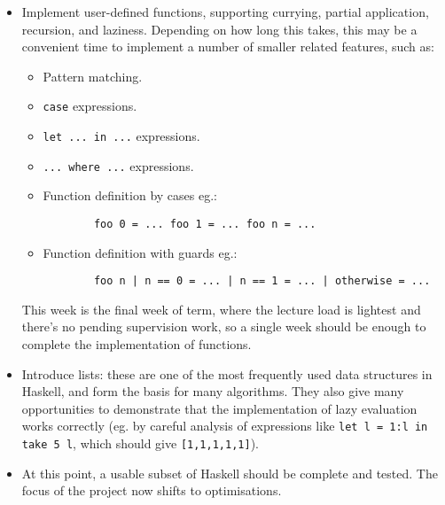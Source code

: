 \documentclass[12pt]{article}
\newcommand\haskell[1]{\texttt{#1}}
\begin{document}
\begin{itemize}
{}
\item
{

    Implement user-defined functions, supporting currying, partial application, recursion, and laziness. Depending on
    how long this takes, this may be a convenient time to implement a number of smaller related features, such as:
    
    \begin{itemize}
    \item Pattern matching.
    \item \haskell{case} expressions.
    \item \haskell{let ... in ...} expressions.
    \item \haskell{... where ...} expressions.
    \item
    {

        Function definition by cases eg.:
        \begin{verbatim}
        foo 0 = ... foo 1 = ... foo n = ...
        \end{verbatim}
    }
    \item
    {

        Function definition with guards eg.:
        \begin{verbatim}
        foo n | n == 0 = ... | n == 1 = ... | otherwise = ...
        \end{verbatim}
    }
    \end{itemize}

    This week is the final week of term, where the lecture load is lightest and there's no pending supervision work, so
    a single week should be enough to complete the implementation of functions.

}
\item
{

    Introduce lists: these are one of the most frequently used data structures in Haskell, and form the basis for many
    algorithms. They also give many opportunities to demonstrate that the implementation of lazy evaluation works
    correctly (eg. by careful analysis of expressions like \haskell{let l = 1:l in take 5 l}, which should give
    \haskell{[1,1,1,1,1]}).

}
\item
{

    At this point, a usable subset of Haskell should be complete and tested. The focus of the project now shifts to
    optimisations.

}
\end{itemize}
\end{document}
